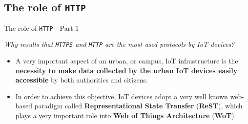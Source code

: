 \documentclass[10pt]{beamer}
\begin{document}
\subsection{The role of \texttt{HTTP}}
\begin{frame}{The role of \texttt{HTTP} - Part 1}

\begin{alertblock}{}
\textit{Why results that \texttt{HTTPS} and \texttt{HTTP} are the most used protocols by IoT devices?}
\end{alertblock}

\begin{itemize}
\justifying
\item A very important aspect of an urban, or campus, IoT infrastructure is the \textbf{necessity to make data collected by the urban IoT devices easily accessible} by both authorities and citizens.

\item In order to achieve this objective, IoT devices adopt a very well known web-based paradigm called  \textbf{Representational State Transfer} (\textbf{ReST}), which plays a very important role into \textbf{Web of Things Architecture} (\textbf{WoT}).

\end{itemize}


\end{frame} 
\end{document}
